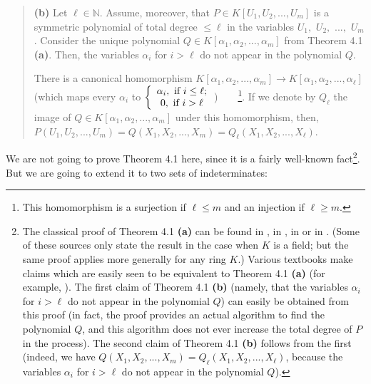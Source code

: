 \documentclass[numbers=enddot,12pt,final,onecolumn,notitlepage]{scrartcl}%
\begin{document}
\begin{quote}
\textbf{(b)} Let $\ell\in\mathbb{N}$. Assume, moreover, that $P\in K\left[
U_{1},U_{2},...,U_{m}\right]  $ is a symmetric polynomial of total degree
$\leq\ell$ in the variables $U_{1},$ $U_{2},$ $...,$ $U_{m}$. Consider the
unique polynomial $Q\in K\left[  \alpha_{1},\alpha_{2},...,\alpha_{m}\right]
$ from Theorem 4.1 \textbf{(a)}. Then, the variables $\alpha_{i}$ for $i>\ell$
do not appear in the polynomial $Q$.

There is a canonical homomorphism $K\left[  \alpha_{1},\alpha_{2}%
,...,\alpha_{m}\right]  \rightarrow K\left[  \alpha_{1},\alpha_{2}%
,...,\alpha_{\ell}\right]  $ (which maps every $\alpha_{i}$ to $\left\{
\begin{array}
[c]{c}%
\alpha_{i},\text{ if }i\leq\ell;\\
0,\text{ if }i>\ell
\end{array}
\right.  $)\ \ \ \ \footnote{This homomorphism is a surjection if $\ell\leq m$
and an injection if $\ell\geq m$.}. If we denote by $Q_{\ell}$ the image of
$Q\in K\left[  \alpha_{1},\alpha_{2},...,\alpha_{m}\right]  $ under this
homomorphism, then, $P\left(  U_{1},U_{2},...,U_{m}\right)  =Q\left(
X_{1},X_{2},...,X_{m}\right)  =Q_{\ell}\left(  X_{1},X_{2},...,X_{\ell
}\right)  $.
\end{quote}

We are not going to prove Theorem 4.1 here, since it is a fairly well-known
fact\footnote{The classical proof of Theorem 4.1 \textbf{(a)} can be found in
\cite[proof of Theorem 1]{BluCos16}, in \cite[Remark 4.16]{Neusel07}, in
\cite[\S 1.1]{Smith95} or in \cite[Chapter 7, \S 1, proof of Theorem
3]{CoLiOS15}. (Some of these sources only state the result in the case when
$K$ is a field; but the same proof applies more generally for any ring $K$.)
Various textbooks make claims which are easily seen to be equivalent to
Theorem 4.1 \textbf{(a)} (for example, \cite[Theorems 3.4 and 3.5]{Newman12}).
The first claim of Theorem 4.1 \textbf{(b)} (namely, that the variables
$\alpha_{i}$ for $i>\ell$ do not appear in the polynomial $Q$) can easily be
obtained from this proof (in fact, the proof provides an actual algorithm to
find the polynomial $Q$, and this algorithm does not ever increase the total
degree of $P$ in the process). The second claim of Theorem 4.1 \textbf{(b)}
follows from the first (indeed, we have $Q\left(  X_{1},X_{2},...,X_{m}%
\right)  =Q_{\ell}\left(  X_{1},X_{2},...,X_{\ell}\right)  $, because the
variables $\alpha_{i}$ for $i>\ell$ do not appear in the polynomial $Q$).}.
But we are going to extend it to two sets of indeterminates:
\end{document}
